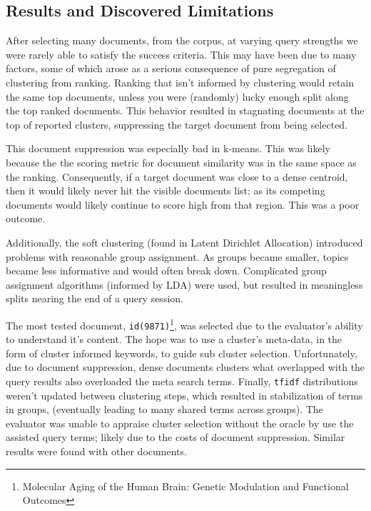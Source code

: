 \documentclass[11pt]{article}
\def\tfidf{\texttt{tfidf}\xspace}
\begin{document}
\subsection{Results and Discovered Limitations}
After selecting many documents, from the corpus, at varying query strengths we were
rarely able to satisfy the success criteria. This may have been due to many factors,
some of which arose as a serious consequence of pure segregation of clustering from
ranking. Ranking that isn't informed by clustering would retain the same top documents,
unless you were (randomly) lucky enough split along the top ranked documents. This
behavior resulted in stagnating documents at the top of reported clusters, suppressing
the target document from being selected.

This document suppression was especially bad in k-means. This was likely because the
the scoring metric for document similarity was in the same space as the ranking.
Consequently, if a target document was close to a dense centroid, then it would likely
never hit the visible documents list; as its competing documents would likely
continue to score high from that region. This was a poor outcome.

Additionally, the soft clustering (found in Latent Dirichlet Allocation) introduced
problems with reasonable group assignment. As groups became smaller, topics became
less informative and would often break down. Complicated group assignment algorithms
(informed by LDA) were used, but resulted in meaningless splits nearing the end
of a query session.

The most tested document,
\texttt{id(9871)}\footnote{Molecular Aging of the Human Brain: Genetic Modulation and Functional Outcomes},
was selected due to the evaluator's ability to understand it's content. The hope
was to use a cluster's meta-data, in the form of cluster informed keywords, to guide
sub cluster selection. Unfortunately, due to document suppression, dense documents
clusters what overlapped with the query results also overloaded the meta search terms.
Finally, \tfidf distributions weren't updated between clustering steps, which resulted
in stabilization of terms in groups, (eventually leading to many shared terms across
groups). The evaluator was unable to appraise cluster selection without the oracle by
use the assisted query terms; likely due to the costs of document suppression. Similar
results were found with other documents.
\end{document}

